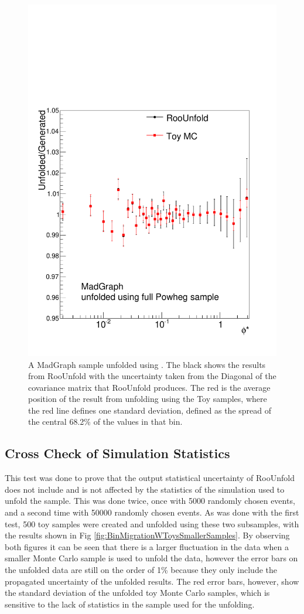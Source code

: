 \begin{figure}[!htbp]
    \centering
    \includegraphics[width=.8\textwidth]{figures/Unfolding/BinM_PM_ALL.pdf}
    \caption[
        BinMigration
    ]{
A MadGraph sample unfolded using \POWHEG. The black shows the results from RooUnfold with the uncertainty taken from the Diagonal of the covariance matrix that RooUnfold produces. The red is the average position of the result from unfolding using the Toy samples, where the red line defines one standard deviation, defined as the spread of the central 68.2\% of the values in that bin. 
    }
    \label{fig:BinMigrationWToys}
\end{figure}
\subsection{Cross Check of Simulation Statistics}
This test was done to prove that the output statistical uncertainty of RooUnfold does not include and is not affected by the statistics of the simulation used to unfold the sample.  This was done twice, once with 5000 randomly chosen \POWHEG events, and a second time with 50000 randomly chosen events. As was done with the first test, 500 toy samples were created and unfolded using these two subsamples, with the results shown in Fig \ref{fig:BinMigrationWToysSmallerSamples}. By observing both figures it can be seen that there is a larger fluctuation in the data when a smaller Monte Carlo sample is used to unfold the data, however the error bars on the unfolded data are still on the order of 1\% because they only include the propagated uncertainty of the unfolded results. The red error bars, however, show the standard deviation of the unfolded toy Monte Carlo samples, which is sensitive to the lack of statistics in the sample used for the unfolding. 


